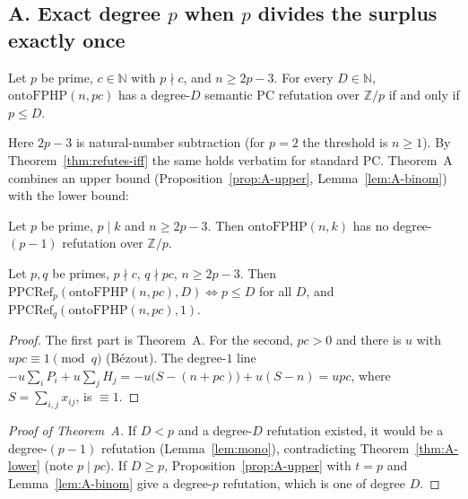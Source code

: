 \subsection{A. Exact degree $p$ when $p$ divides the surplus exactly once}
\label{sec:lean-A}

\begin{theorem}[A]\label{thm:A}
Let $p$ be prime, $c\in\mathbb N$ with $p\nmid c$, and $n\ge 2p-3$.  For every
$D\in\mathbb N$, $\mathrm{ontoFPHP}(n,pc)$ has a degree-$D$ semantic PC refutation
over $\mathbb Z/p$ if and only if $p\le D$.
\end{theorem}

Here $2p-3$ is natural-number subtraction (for $p=2$ the threshold is $n\ge1$).
By Theorem~\ref{thm:refutes-iff} the same holds verbatim for standard PC.
Theorem~A combines an upper bound (Proposition~\ref{prop:A-upper},
Lemma~\ref{lem:A-binom}) with the lower bound:

\begin{theorem}\label{thm:A-lower}
Let $p$ be prime, $p\mid k$ and $n\ge2p-3$.  Then $\mathrm{ontoFPHP}(n,k)$ has no
degree-$(p-1)$ refutation over $\mathbb Z/p$.
\end{theorem}

\begin{corollary}[separation]\label{cor:A-sep}
Let $p,q$ be primes, $p\nmid c$, $q\nmid pc$, $n\ge2p-3$.  Then
$\mathrm{PPCRef}_p(\mathrm{ontoFPHP}(n,pc),D)\iff p\le D$ for all $D$, and
$\mathrm{PPCRef}_q(\mathrm{ontoFPHP}(n,pc),1)$.
\end{corollary}

\begin{proof}
The first part is Theorem~A.  For the second, $pc>0$ and there is $u$ with
$upc\equiv1\pmod q$ (B\'ezout).  The degree-$1$ line
$-u\sum_iP_i+u\sum_jH_j=-u\bigl(S-(n+pc)\bigr)+u(S-n)=upc$, where
$S=\sum_{i,j}x_{ij}$, is $\equiv1$.
\end{proof}

\begin{proof}[Proof of Theorem~A]
If $D<p$ and a degree-$D$ refutation existed, it would be a degree-$(p-1)$
refutation (Lemma~\ref{lem:mono}), contradicting Theorem~\ref{thm:A-lower} (note $p\mid pc$).
If $D\ge p$, Proposition~\ref{prop:A-upper} with $t=p$ and Lemma~\ref{lem:A-binom}
give a degree-$p$ refutation, which is one of degree $D$.
\end{proof}

